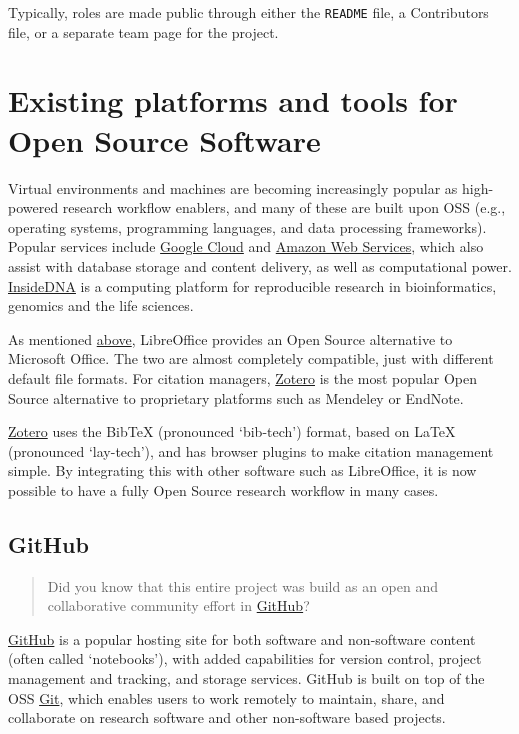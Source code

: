 \documentclass[]{book}
\begin{document}
Typically, roles are made public through either the \texttt{README} file, a Contributors file, or a separate team page for the project.

\hypertarget{existing-platforms-and-tools-for-open-source-software}{%
\section{Existing platforms and tools for Open Source Software }\label{existing-platforms-and-tools-for-open-source-software}}

Virtual environments and machines are becoming increasingly popular as high-powered research workflow enablers, and many of these are built upon OSS (e.g., operating systems, programming languages, and data processing frameworks). Popular services include \href{https://cloud.google.com/compute/}{Google Cloud} and \href{https://aws.amazon.com/}{Amazon Web Services}, which also assist with database storage and content delivery, as well as computational power. \href{https://insidedna.me/}{InsideDNA} is a computing platform for reproducible research in bioinformatics, genomics and the life sciences.

As mentioned \protect\hyperlink{What_OSS}{above}, LibreOffice provides an Open Source alternative to Microsoft Office. The two are almost completely compatible, just with different default file formats. For citation managers, \href{https://www.zotero.org/}{Zotero} is the most popular Open Source alternative to proprietary platforms such as Mendeley or EndNote.

\href{https://www.zotero.org/}{Zotero} uses the BibTeX (pronounced `bib-tech') format, based on LaTeX (pronounced `lay-tech'), and has browser plugins to make citation management simple. By integrating this with other software such as LibreOffice, it is now possible to have a fully Open Source research workflow in many cases.

\hypertarget{github}{%
\subsection{GitHub }\label{github}}

\begin{quote}
Did you know that this entire project was build as an open and collaborative community effort in \href{https://github.com/OpenScienceMOOC/}{GitHub}?
\end{quote}

\href{https://github.com/}{GitHub} is a popular hosting site for both software and non-software content (often called `notebooks'), with added capabilities for version control, project management and tracking, and storage services. GitHub is built on top of the OSS \href{https://git-scm.com/}{Git}, which enables users to work remotely to maintain, share, and collaborate on research software and other non-software based projects.
\end{document}
